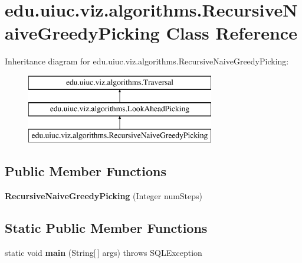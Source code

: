 \hypertarget{classedu_1_1uiuc_1_1viz_1_1algorithms_1_1_recursive_naive_greedy_picking}{}\section{edu.\+uiuc.\+viz.\+algorithms.\+Recursive\+Naive\+Greedy\+Picking Class Reference}
\label{classedu_1_1uiuc_1_1viz_1_1algorithms_1_1_recursive_naive_greedy_picking}
Inheritance diagram for edu.\+uiuc.\+viz.\+algorithms.\+Recursive\+Naive\+Greedy\+Picking\+:\begin{figure}[H]
\begin{center}
\leavevmode
\includegraphics[height=3.000000cm]{classedu_1_1uiuc_1_1viz_1_1algorithms_1_1_recursive_naive_greedy_picking}
\end{center}
\end{figure}
\subsection*{Public Member Functions}
\begin{DoxyCompactItemize}
\item 
\mbox{\label{classedu_1_1uiuc_1_1viz_1_1algorithms_1_1_recursive_naive_greedy_picking_a85dbb8c0641f4e26ba2c60693c84d8ea}} 
{\bfseries Recursive\+Naive\+Greedy\+Picking} (Integer num\+Steps)
\end{DoxyCompactItemize}
\subsection*{Static Public Member Functions}
\begin{DoxyCompactItemize}
\item 
\mbox{\label{classedu_1_1uiuc_1_1viz_1_1algorithms_1_1_recursive_naive_greedy_picking_aeab9fb53dfd3b9914f9aca46fe3262cc}} 
static void {\bfseries main} (String\mbox{[}$\,$\mbox{]} args)  throws S\+Q\+L\+Exception 	
\end{DoxyCompactItemize}
